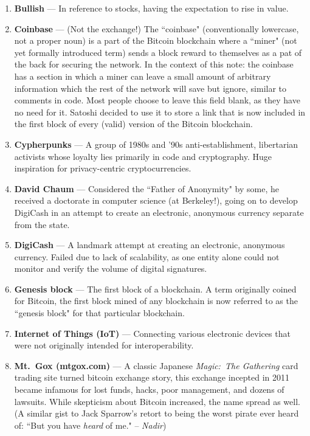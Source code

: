 \documentclass[11pt]{article}
\begin{document}
    \begin{enumerate}
        \item \textbf{Bullish} --- In reference to stocks, having the expectation to rise in value.
    
        \item \textbf{Coinbase} --- (Not the exchange!) The ``coinbase" (conventionally lowercase, not a proper noun) is a part of the Bitcoin blockchain where a ``miner" (not yet formally introduced term) sends a block reward to themselves as a pat of the back for securing the network. In the context of this note: the coinbase has a section in which a miner can leave a small amount of arbitrary information which the rest of the network will save but ignore, similar to comments in code. Most people choose to leave this field blank, as they have no need for it. Satoshi decided to use it to store a link that is now included in the first block of every (valid) version of the Bitcoin blockchain.
        
        \item \textbf{Cypherpunks} --- A group of 1980s and '90s anti-establishment, libertarian activists whose loyalty lies primarily in code and cryptography. Huge inspiration for privacy-centric cryptocurrencies.
        
        \item \textbf{David Chaum} --- Considered the ``Father of Anonymity" by some, he received a doctorate in computer science (at Berkeley!), going on to develop DigiCash in an attempt to create an electronic, anonymous currency separate from the state.
        
        \item \textbf{DigiCash} --- A landmark attempt at creating an electronic, anonymous currency. Failed due to lack of scalability, as one entity alone could not monitor and verify the volume of digital signatures.
        
        \item \textbf{Genesis block} --- The first block of a blockchain. A term originally coined for Bitcoin, the first block mined of any blockchain is now referred to as the ``genesis block" for that particular blockchain.
        
        \item \textbf{Internet of Things (IoT)} --- Connecting various electronic devices that were not originally intended for interoperability. 
        
        \item \textbf{Mt.\ Gox (mtgox.com)} --- A classic Japanese \textit{Magic:\ The Gathering} card trading site turned bitcoin exchange story, this exchange incepted in 2011 became infamous for lost funds, hacks, poor management, and dozens of lawsuits. While skepticism about Bitcoin increased, the name spread as well. (A similar gist to Jack Sparrow's retort to being the worst pirate ever heard of: ``But you have \emph{heard} of me." -- \textit{Nadir})
        

\end{enumerate}
\end{document}

